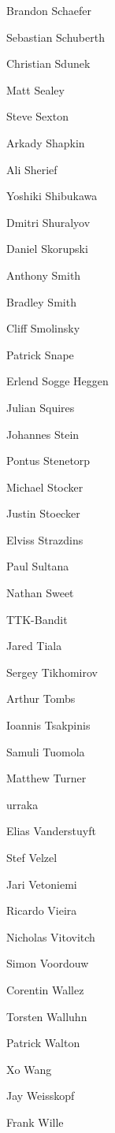 \begin{DoxyItemize}
\item Brandon Schaefer
\item Sebastian Schuberth
\item Christian Sdunek
\item Matt Sealey
\item Steve Sexton
\item Arkady Shapkin
\item Ali Sherief
\item Yoshiki Shibukawa
\item Dmitri Shuralyov
\item Daniel Skorupski
\item Anthony Smith
\item Bradley Smith
\item Cliff Smolinsky
\item Patrick Snape
\item Erlend Sogge Heggen
\item Julian Squires
\item Johannes Stein
\item Pontus Stenetorp
\item Michael Stocker
\item Justin Stoecker
\item Elviss Strazdins
\item Paul Sultana
\item Nathan Sweet
\item T\+T\+K-\/\+Bandit
\item Jared Tiala
\item Sergey Tikhomirov
\item Arthur Tombs
\item Ioannis Tsakpinis
\item Samuli Tuomola
\item Matthew Turner
\item urraka
\item Elias Vanderstuyft
\item Stef Velzel
\item Jari Vetoniemi
\item Ricardo Vieira
\item Nicholas Vitovitch
\item Simon Voordouw
\item Corentin Wallez
\item Torsten Walluhn
\item Patrick Walton
\item Xo Wang
\item Jay Weisskopf
\item Frank Wille

\end{DoxyItemize}
